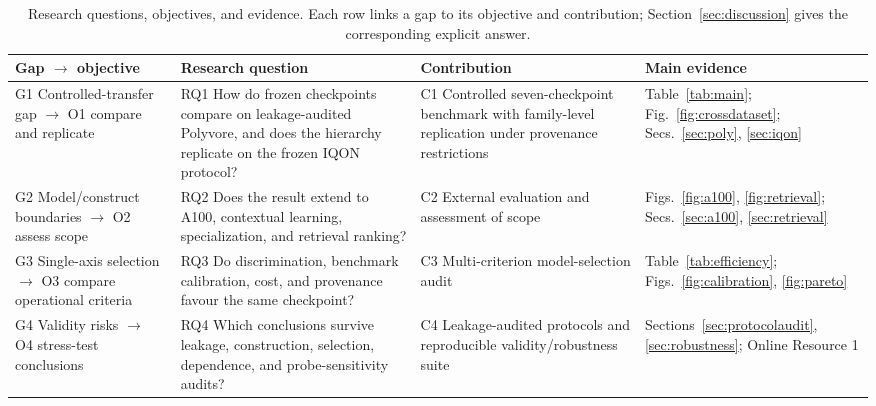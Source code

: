 \begin{table}[t]
\caption{Research questions, objectives, and evidence. Each row links a gap to its objective and contribution; Section~\ref{sec:discussion} gives the corresponding explicit answer.}
\label{tab:framework}
\centering\small{}
\setlength{\tabcolsep}{4pt}\renewcommand{\arraystretch}{1.12}
\begin{tabularx}{\textwidth}{@{}>{\raggedright\arraybackslash}p{}>{\raggedright\arraybackslash}p{}>{\raggedright\arraybackslash}p{}>{\raggedright\arraybackslash}X@{}}
\toprule
Gap $\rightarrow$ objective & Research question & Contribution & Main evidence \\
\midrule
G1 Controlled-transfer gap $\rightarrow$ O1 compare and replicate & RQ1 How do frozen checkpoints compare on leakage-audited Polyvore, and does the hierarchy replicate on the frozen IQON protocol? & C1 Controlled seven-checkpoint benchmark with family-level replication under provenance restrictions & Table~\ref{tab:main}; Fig.~\ref{fig:crossdataset}; Secs.~\ref{sec:poly}, \ref{sec:iqon} \\
G2 Model/construct boundaries $\rightarrow$ O2 assess scope & RQ2 Does the result extend to A100, contextual learning, specialization, and retrieval ranking? & C2 External evaluation and assessment of scope & Figs.~\ref{fig:a100}, \ref{fig:retrieval}; Secs.~\ref{sec:a100}, \ref{sec:retrieval} \\
G3 Single-axis selection $\rightarrow$ O3 compare operational criteria & RQ3 Do discrimination, benchmark calibration, cost, and provenance favour the same checkpoint? & C3 Multi-criterion model-selection audit & Table~\ref{tab:efficiency}; Figs.~\ref{fig:calibration}, \ref{fig:pareto} \\
G4 Validity risks $\rightarrow$ O4 stress-test conclusions & RQ4 Which conclusions survive leakage, construction, selection, dependence, and probe-sensitivity audits? & C4 Leakage-audited protocols and reproducible validity/robustness suite & Sections~\ref{sec:protocolaudit}, \ref{sec:robustness}; Online Resource 1 \\
\bottomrule
\end{tabularx}
\end{table}
